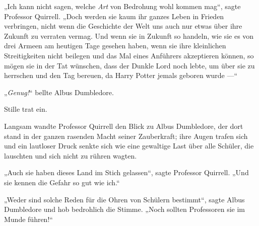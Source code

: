 „Ich kann nicht sagen, welche \emph{Art} von Bedrohung wohl kommen mag“, sagte Professor Quirrell.
„Doch werden sie kaum ihr ganzes Leben in Frieden verbringen, nicht wenn die Geschichte der Welt uns auch nur etwas über ihre Zukunft zu verraten vermag. Und wenn sie in Zukunft so handeln, wie sie es von drei Armeen am heutigen Tage gesehen haben, wenn sie ihre kleinlichen Streitigkeiten nicht beilegen und das Mal eines Anführers akzeptieren können, so mögen sie in der Tat wünschen, dass der Dunkle Lord noch lebte, um über sie zu herrschen und den Tag bereuen, da Harry Potter jemals geboren wurde —“

„\emph{Genug!}“ bellte Albus Dumbledore.

Stille trat ein.

Langsam wandte Professor Quirrell den Blick zu Albus Dumbledore, der dort stand in der ganzen rasenden Macht seiner Zauberkraft; ihre Augen trafen sich und ein lautloser Druck senkte sich wie eine gewaltige Last über alle Schüler, die lauschten und sich nicht zu rühren wagten.

„Auch sie haben dieses Land im Stich gelassen“, sagte Professor Quirrell.
„Und sie kennen die Gefahr so gut wie ich.“

„Weder sind solche Reden für die Ohren von Schülern bestimmt“, sagte Albus Dumbledore und hob bedrohlich die Stimme.
„Noch sollten Professoren sie im Munde führen!“

